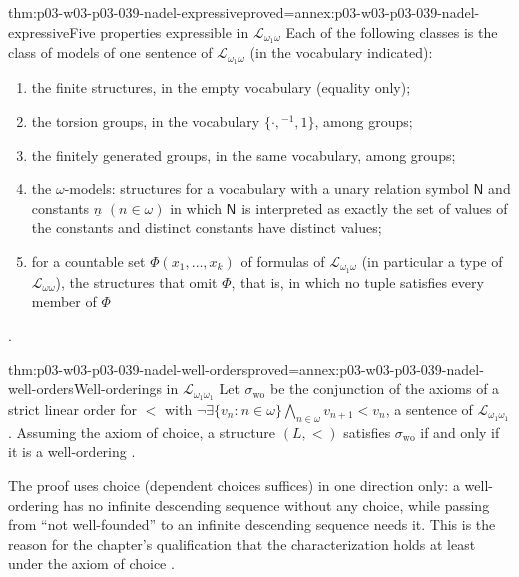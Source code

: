 \begin{hbtheorem}{thm:p03-w03-p03-039-nadel-expressive}{proved=annex:p03-w03-p03-039-nadel-expressive}{Five properties expressible in \(\mathscr L_{\omega_1\omega}\)}
Each of the following classes is the class of models of one sentence of
\(\mathscr L_{\omega_1\omega}\) (in the vocabulary indicated):
\begin{enumerate}
\item the finite structures, in the empty vocabulary (equality only);
\item the torsion groups, in the vocabulary \(\{\cdot,{}^{-1},1\}\), among groups;
\item the finitely generated groups, in the same vocabulary, among groups;
\item the \(\omega\)-models: structures for a vocabulary with a unary
      relation symbol \(\mathsf N\) and constants \(\underline n\)
      \((n\in\omega)\) in which \(\mathsf N\) is interpreted as exactly the
      set of values of the constants and distinct constants have distinct
      values;
\item for a countable set \(\Phi(x_1,\dots,x_k)\) of formulas of
      \(\mathscr L_{\omega_1\omega}\) (in particular a type of
      \(\mathscr L_{\omega\omega}\)), the structures that omit \(\Phi\),
      that is, in which no tuple satisfies every member of \(\Phi\)
\end{enumerate}
\cite[\S\S~1.1 and~1.3, pp.~272--274]{Nadel1985Admissible}.
\end{hbtheorem}

\begin{hbtheorem}{thm:p03-w03-p03-039-nadel-well-orders}{proved=annex:p03-w03-p03-039-nadel-well-orders}{Well-orderings in \(\mathscr L_{\omega_1\omega_1}\)}
Let \(\sigma_{\mathrm{wo}}\) be the conjunction of the axioms of a strict
linear order for \(<\) with
\(\neg\exists\{v_n:n\in\omega\}\bigwedge_{n\in\omega}v_{n+1}<v_n\), a
sentence of \(\mathscr L_{\omega_1\omega_1}\). Assuming the axiom of choice,
a structure \((L,<)\) satisfies \(\sigma_{\mathrm{wo}}\) if and only if it is
a well-ordering \cite[p.~274]{Nadel1985Admissible}.
\end{hbtheorem}

The proof uses choice (dependent choices suffices) in one direction only: a
well-ordering has no infinite descending sequence without any choice, while
passing from ``not well-founded'' to an infinite descending sequence needs
it. This is the reason for the chapter's qualification that the
characterization holds at least under the axiom of choice
\cite[p.~274]{Nadel1985Admissible}.

